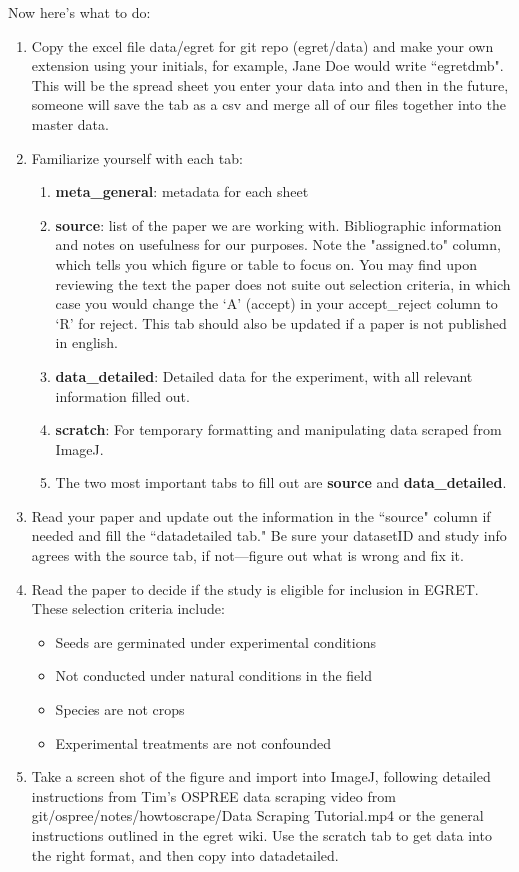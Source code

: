 \documentclass{article}[12pt]
\begin{document}
Now here's what to do:
\begin{enumerate}
\item Copy the excel file data/egret for git repo (egret/data) and make your own extension using your initials, for example, Jane Doe would write ``egret\textunderscore dmb". This will be the spread sheet you enter your data into and then in the future, someone will save the tab as a csv and merge all of our files together into the master data.
\item Familiarize yourself with each tab:
  \begin{enumerate}
  \item \textbf{meta\_general}: metadata for each sheet
  \item \textbf{source}: list of the paper we are working with. Bibliographic information and notes on usefulness for our purposes. Note the "assigned.to" column, which tells you which figure or table to focus on. You may find upon reviewing the text the paper does not suite out selection criteria, in which case you would change the `A' (accept) in your accept\_reject column to `R' for reject. This tab should also be updated if a paper is not published in english.
  \item \textbf{data\_detailed}: Detailed data for the experiment, with all relevant information filled out.
  \item \textbf{scratch}: For temporary formatting and manipulating data scraped from ImageJ.
  \item The two most important tabs to fill out are \textbf{source} and \textbf{data\_detailed}. 
  \end{enumerate}
\item Read your paper and update out the information in the ``source" column if needed and  fill the ``data\textunderscore detailed tab." Be sure your datasetID and study info agrees with the source tab, if not---figure out what is wrong and fix it.
\item Read the paper to decide if the study is eligible for inclusion in EGRET. These selection criteria include:
\begin{itemize}
\item Seeds are germinated under experimental conditions
\item Not conducted under natural conditions in the field 
\item Species are not crops
\item Experimental treatments are not confounded
\end{itemize}
\item Take a screen shot of the figure and import into ImageJ, following detailed instructions from Tim's OSPREE data scraping video from git/ospree/notes/howtoscrape/Data Scraping Tutorial.mp4 or the general instructions outlined in the egret wiki. Use the scratch tab to get data into the right format, and then copy into data\textunderscore detailed.\end{enumerate}
\end{document}
